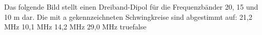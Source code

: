    {Das folgende Bild stellt einen Dreiband-Dipol für die Frequenzbänder 20, 15 und 10 m dar. Die mit a gekennzeichneten Schwingkreise sind abgestimmt auf:}
    {21,2 MHz}
    {10,1 MHz}
    {14,2 MHz}
    {29,0 MHz}
    {true}{false}